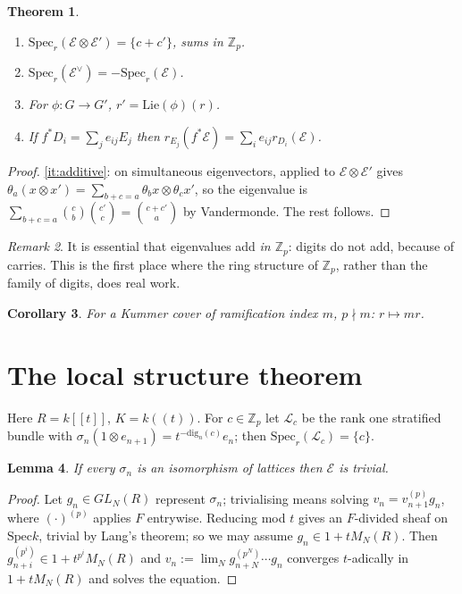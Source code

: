 \documentclass[11pt,reqno]{amsart}
\newcommand{\Zp}{\mathbb{Z}_p}
\newcommand{\cE}{\mathcal{E}}
\newcommand{\cL}{\mathcal{L}}
\newcommand{\Spec}{\mathrm{Spec}}
\newcommand{\dig}{\mathrm{dig}}
\theoremstyle{plain}
\newtheorem{theorem}{Theorem}[section]
\newtheorem{lemma}[theorem]{Lemma}
\newtheorem{corollary}[theorem]{Corollary}
\theoremstyle{definition}
\theoremstyle{remark}
\newtheorem{remark}[theorem]{Remark}
\numberwithin{equation}{section}
\begin{document}
\begin{theorem}\label{thm:functoriality}
\begin{enumerate}
\item\label{it:additive} $\mathrm{Spec}_r(\cE\otimes\cE')
      =\{c+c'\}$, sums in $\Zp$.
\item $\mathrm{Spec}_r(\cE^\vee)=-\mathrm{Spec}_r(\cE)$.
\item For $\phi\colon G\to G'$, $r'=\mathrm{Lie}(\phi)(r)$.
\item\label{it:pullback} If $f^*D_i=\sum_je_{ij}E_j$ then
      $r_{E_j}(f^*\cE)=\sum_ie_{ij}r_{D_i}(\cE)$.
\end{enumerate}
\end{theorem}
\begin{proof}
\eqref{it:additive}: on simultaneous eigenvectors, 
applied to $\cE\otimes\cE'$ gives
$\theta_a(x\otimes x')=\sum_{b+c=a}\theta_b x\otimes\theta_c x'$, so the
eigenvalue is $\sum_{b+c=a}\binom{c}{b}\binom{c'}{c}=\binom{c+c'}{a}$ by
Vandermonde.  The rest follows.
\end{proof}

\begin{remark}
It is essential that eigenvalues add \emph{in $\Zp$}: digits do not add,
because of carries.  This is the first place where the ring structure of
$\Zp$, rather than the family of digits, does real work.
\end{remark}

\begin{corollary}\label{cor:tame}
For a Kummer cover of ramification index $m$, $p\nmid m$: $r\mapsto mr$.
\end{corollary}

\section{The local structure theorem}\label{sec:localstructure}

Here $R=k[[t]]$, $K=k((t))$.  For $c\in\Zp$ let $\cL_c$ be the rank one
stratified bundle with $\sigma_n(1\otimes e_{n+1})=t^{-\dig_n(c)}e_n$; then
$\mathrm{Spec}_r(\cL_c)=\{c\}$.

\begin{lemma}\label{lem:mu0}
If every $\sigma_n$ is an isomorphism of lattices then $\cE$ is trivial.
\end{lemma}
\begin{proof}
Let $g_n\in GL_N(R)$ represent $\sigma_n$; trivialising means solving
$v_n=v_{n+1}^{(p)}g_n$, where $(\cdot)^{(p)}$ applies $F$ entrywise.
Reducing mod $t$ gives an $F$-divided sheaf on $\Spec k$, trivial by
Lang's theorem; so we may assume $g_n\in1+tM_N(R)$.  Then
$g_{n+i}^{(p^i)}\in1+t^{p^i}M_N(R)$ and
$v_n:=\lim_Ng_{n+N}^{(p^N)}\cdots g_n$ converges $t$-adically in
$1+tM_N(R)$ and solves the equation.
\end{proof}
\end{document}
